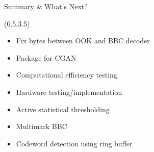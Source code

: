 \documentclass[xcolor=x11names,compress,handout]{beamer}
\begin{document}

\begin{frame}{Summary \& What's Next?}

	\begin{textblock}{14.5}(0.5,3.5)
		\begin{itemize}
			\item Fix bytes between OOK and BBC decoder
			\item Package for CGAN
			\item Computational efficiency testing
			\item Hardware testing/implementation
			\item Active statistical thresholding
			\item Multimark BBC
			\item Codeword detection using ring buffer
		\end{itemize}
	\end{textblock}
\end{frame}
\end{document}
